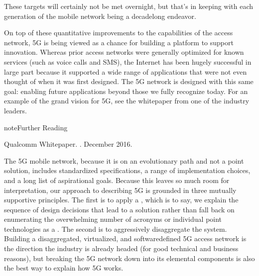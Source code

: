 \documentclass[a4paper,11pt,english]{sphinxmanual}
\begin{document}
\sphinxAtStartPar
These targets will certainly not be met overnight, but that’s in keeping
with each generation of the mobile network being a decade\sphinxhyphen{}long
endeavor.

\sphinxAtStartPar
On top of these quantitative improvements to the capabilities of the
access network, 5G is being viewed as a chance for building a platform
to support innovation. Whereas prior access networks were generally
optimized for known services (such as voice calls and SMS), the
Internet has been hugely successful in large part because it supported
a wide range of applications that were not even thought of when it was
first designed. The 5G network is designed with this same goal:
enabling future applications beyond those we fully recognize today.
For an example of the grand vision for 5G, see the whitepaper
from one of the industry leaders.

\label{\detokenize{intro:reading-vision}}
\begin{sphinxadmonition}{note}{Further Reading}

\sphinxAtStartPar
Qualcomm Whitepaper. .
December 2016.
\end{sphinxadmonition}

\sphinxAtStartPar
The 5G mobile network, because it is on an evolutionary path and not a
point solution, includes standardized specifications, a range of
implementation choices, and a long list of aspirational goals. Because
this leaves so much room for interpretation, our approach to
describing 5G is grounded in three mutually supportive principles. The
first is to apply a , which is to say, we explain the
sequence of design decisions that lead to a solution rather than fall
back on enumerating the overwhelming number of acronyms or individual
point technologies as a . The second is to aggressively
disaggregate the system. Building a disaggregated, virtualized, and
software\sphinxhyphen{}defined 5G access network is the direction the industry is
already headed (for good technical and business reasons), but breaking
the 5G network down into its elemental components is also the best way
to explain how 5G works.
\end{document}
